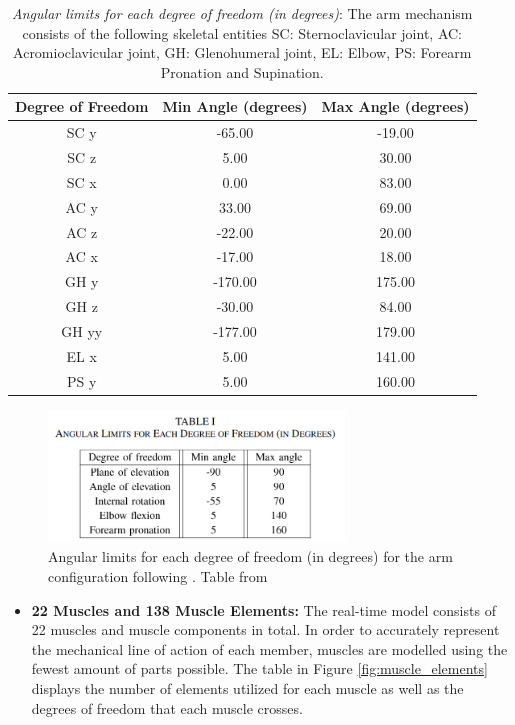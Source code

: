 \begin{table}[h!]
\centering
\caption {\textit{Angular limits for each degree of freedom (in degrees)}: The arm mechanism consists of the following skeletal entities SC: Sternoclavicular joint, AC: Acromioclavicular joint, GH: Glenohumeral joint, EL: Elbow, PS: Forearm Pronation and Supination.}
\label{table:11dof}
\begin{tabular}{ccc}
\hline
\textbf{Degree of Freedom} & \textbf{Min Angle (degrees)} & \textbf{Max Angle (degrees)} \\
\hline
SC y & -65.00 & -19.00 \\
SC z & 5.00 & 30.00 \\
SC x & 0.00 & 83.00 \\
AC y & 33.00 & 69.00 \\
AC z & -22.00 & 20.00 \\
AC x & -17.00 & 18.00 \\
GH y & -170.00 & 175.00 \\
GH z & -30.00 & 84.00 \\
GH yy & -177.00 & 179.00 \\
EL x & 5.00 & 141.00 \\
PS y & 5.00 & 160.00 \\
\hline
\end{tabular}

\end{table}

\begin{figure}[h!]
    \centering
    \includegraphics[width=0.7\textwidth]{Pictures/DAS/5dof.png}
    \caption{Angular limits for each degree of freedom (in degrees) for the arm configuration following \cite{ISB}. Table from \cite{RT3D}}
    \label{fig:5dof}
\end{figure}
\newpage
\begin{itemize}
    \item \textbf{22 Muscles and 138 Muscle Elements:} The real-time model consists of 22 muscles and muscle components in total. In order to accurately represent the mechanical line of action of each member, muscles are modelled using the fewest amount of parts possible. The table in Figure  \ref{fig:muscle_elements} displays the number of elements utilized for each muscle as well as the degrees of freedom that each muscle crosses. 
    
\end{itemize}


